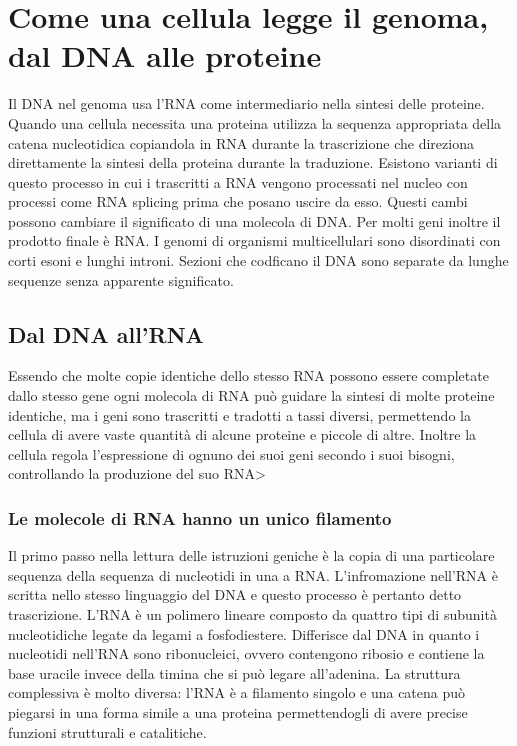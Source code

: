 \chapter{Come una cellula legge il genoma, dal DNA alle proteine}
Il DNA nel genoma usa l'RNA come intermediario nella sintesi delle proteine. Quando una cellula necessita una proteina utilizza la sequenza appropriata della catena nucleotidica 
copiandola in RNA durante la trascrizione che direziona direttamente la sintesi della proteina durante la traduzione. Esistono varianti di questo processo in cui i trascritti a RNA 
vengono processati nel nucleo con processi come RNA splicing prima che posano uscire da esso. Questi cambi possono cambiare il significato di una molecola di DNA. Per molti geni inoltre
il prodotto finale \`e RNA. I genomi di organismi multicellulari sono disordinati con corti esoni e lunghi introni. Sezioni che codficano il DNA sono separate da lunghe sequenze senza 
apparente significato. 
\section{Dal DNA all'RNA}
Essendo che molte copie identiche dello stesso RNA possono essere completate dallo stesso gene ogni molecola di RNA pu\`o guidare la sintesi di molte proteine identiche, ma i geni sono
trascritti e tradotti a tassi diversi, permettendo la cellula di avere vaste quantit\`a di alcune proteine e piccole di altre. Inoltre la cellula regola l'espressione di ognuno dei suoi
geni secondo i suoi bisogni, controllando la produzione del suo RNA>
\subsection{Le molecole di RNA hanno un unico filamento}
Il primo passo nella lettura delle istruzioni geniche \`e la copia di una particolare sequenza della sequenza di nucleotidi in una a RNA. L'infromazione nell'RNA \`e scritta nello stesso
linguaggio del DNA e questo processo \`e pertanto detto trascrizione. L'RNA \`e un polimero lineare composto da quattro tipi di subunit\`a nucleotidiche legate da legami a fosfodiestere.
Differisce dal DNA in quanto i nucleotidi nell'RNA sono ribonucleici, ovvero contengono ribosio e contiene la base uracile invece della timina che si pu\`o legare all'adenina. La
struttura complessiva \`e molto diversa: l'RNA \`e a filamento singolo e una catena pu\`o piegarsi in una forma simile a una proteina permettendogli di avere precise funzioni strutturali
e catalitiche.
